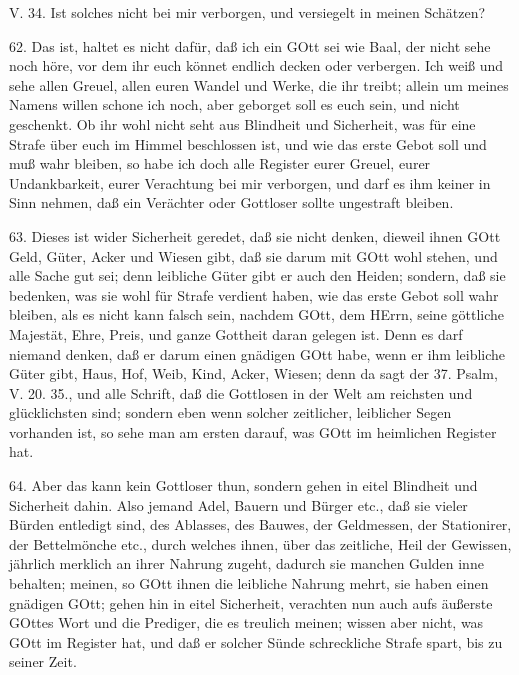 \begin{schriftzitat}
V. 34. Ist solches nicht bei mir verborgen, und versiegelt in meinen Schätzen?
\end{schriftzitat}

62. Das ist, haltet es nicht dafür, daß ich ein GOtt sei wie Baal, der nicht sehe noch höre, vor dem ihr euch könnet endlich decken oder verbergen. Ich weiß und sehe allen Greuel, allen euren Wandel und Werke, die ihr treibt; allein um meines Namens willen schone ich noch, aber geborget soll es euch sein, und nicht geschenkt. Ob ihr wohl nicht seht aus Blindheit und Sicherheit, was für eine Strafe über euch im Himmel beschlossen ist, und wie das erste Gebot soll und muß wahr bleiben, so habe ich doch alle Register eurer Greuel, eurer Undankbarkeit, eurer Verachtung bei mir verborgen, und darf es ihm keiner in Sinn nehmen, daß ein Verächter oder Gottloser sollte ungestraft bleiben.

63. Dieses ist wider Sicherheit geredet, daß sie nicht denken, dieweil ihnen GOtt Geld, Güter, Acker und Wiesen gibt, daß sie darum mit GOtt wohl stehen, und alle Sache gut sei; denn leibliche Güter gibt er auch den Heiden; sondern, daß sie bedenken, was sie wohl für Strafe verdient haben, wie das erste Gebot soll wahr bleiben, als es nicht kann falsch sein, nachdem GOtt, dem HErrn, seine göttliche Majestät, Ehre, Preis, und ganze Gottheit daran gelegen ist. Denn es darf niemand denken, daß er darum einen gnädigen GOtt habe, wenn er ihm leibliche Güter gibt, Haus, Hof, Weib, Kind, Acker, Wiesen; denn da sagt der 37. Psalm, V. 20. 35., und alle Schrift, daß die Gottlosen in der Welt am reichsten und glücklichsten sind; sondern eben wenn solcher zeitlicher, leiblicher Segen vorhanden ist, so sehe man am ersten darauf, was GOtt im heimlichen Register hat.

64. Aber das kann kein Gottloser thun, sondern gehen in eitel Blindheit und Sicherheit dahin. Also jemand Adel, Bauern und Bürger etc., daß sie vieler Bürden entledigt sind, des Ablasses, des Bauwes, der Geldmessen, der Stationirer, der Bettelmönche etc., durch welches ihnen, über das zeitliche, Heil der Gewissen, jährlich merklich an ihrer Nahrung zugeht, dadurch sie manchen Gulden inne behalten; meinen, so GOtt ihnen die leibliche Nahrung mehrt, sie haben einen gnädigen GOtt; gehen hin in eitel Sicherheit, verachten nun auch aufs äußerste GOttes Wort und die Prediger, die es treulich meinen; wissen aber nicht, was GOtt im Register hat, und daß er solcher Sünde schreckliche Strafe spart, bis zu seiner Zeit.

